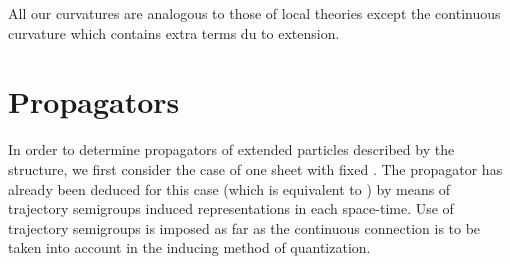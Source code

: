 \documentclass[12pt,a4paper]{article}
\begin{document}
All our curvatures are analogous to those of local theories\cite{Konisi
1996,Kubo 1998} except the continuous curvature which contains extra terms du
to extension.

\section{Propagators}

In order to determine propagators of extended particles described by the
\coordHE{} structure, we first consider
the case of one sheet with fixed \coordHE{}. The propagator has already been deduced
for this case (which is equivalent to \coordHE{}) by
means of trajectory semigroups induced representations in each
space-time.\cite{Smida 1998} Use of trajectory semigroups is imposed as far as
the continuous connection is to be taken into account in the inducing method
of quantization.
\end{document}
